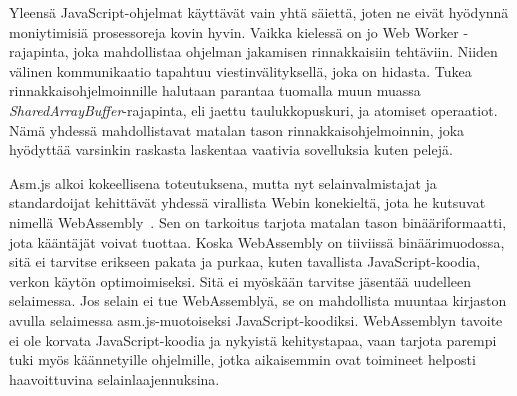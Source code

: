 Yleensä JavaScript-ohjelmat käyttävät vain yhtä säiettä, joten ne eivät hyödynnä moniytimisiä prosessoreja kovin hyvin. Vaikka kielessä on jo Web Worker -rajapinta, joka mahdollistaa ohjelman jakamisen rinnakkaisiin tehtäviin. Niiden välinen kommunikaatio tapahtuu viestinvälityksellä, joka on hidasta. Tukea rinnakkaisohjelmoinnille halutaan parantaa tuomalla muun muassa \textit{SharedArrayBuffer}-rajapinta, eli jaettu taulukkopuskuri, ja atomiset operaatiot. Nämä yhdessä mahdollistavat matalan tason rinnakkaisohjelmoinnin, joka hyödyttää varsinkin raskasta laskentaa vaativia sovelluksia kuten pelejä.

Asm.js alkoi kokeellisena toteutuksena, mutta nyt selainvalmistajat ja standardoijat kehittävät yhdessä virallista Webin konekieltä, jota he kutsuvat nimellä WebAssembly~\cite{webassembly}. Sen on tarkoitus tarjota matalan tason binääriformaatti, jota kääntäjät voivat tuottaa. Koska WebAssembly on tiiviissä binäärimuodossa, sitä ei tarvitse erikseen pakata ja purkaa, kuten tavallista JavaScript-koodia, verkon käytön optimoimiseksi. Sitä ei myöskään tarvitse jäsentää uudelleen selaimessa. Jos selain ei tue WebAssemblyä, se on mahdollista muuntaa kirjaston avulla selaimessa asm.js-muotoiseksi JavaScript-koodiksi. WebAssemblyn tavoite ei ole korvata JavaScript-koodia ja nykyistä kehitystapaa, vaan tarjota parempi tuki myös käännetyille ohjelmille, jotka aikaisemmin ovat toimineet helposti haavoittuvina selainlaajennuksina.

